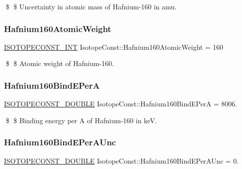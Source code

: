 \$ \$ Uncertainty in atomic mass of Hafnium-\/160 in amu. \mbox{\label{group___isotope_const-_hafnium-_hf160_gaa30ea89c0e0702326d67f6d4d49fdc7a}} 
\subsubsection{\texorpdfstring{Hafnium160\+Atomic\+Weight}{Hafnium160AtomicWeight}}
{\footnotesize\ttfamily \mbox{\hyperlink{group___isotope_const-_macros_ga5f18360b3e99483a35c32d789e62621c}{I\+S\+O\+T\+O\+P\+E\+C\+O\+N\+S\+T\+\_\+\+I\+NT}} Isotope\+Const\+::\+Hafnium160\+Atomic\+Weight = 160}

\$ \$ Atomic weight of Hafnium-\/160. \mbox{\label{group___isotope_const-_hafnium-_hf160_ga668340f5ff3a6a2ded97cff1041f5a24}} 
\subsubsection{\texorpdfstring{Hafnium160\+Bind\+E\+PerA}{Hafnium160BindEPerA}}
{\footnotesize\ttfamily \mbox{\hyperlink{group___isotope_const-_macros_ga8f45a7272ce02c0b4c65c44636ed719a}{I\+S\+O\+T\+O\+P\+E\+C\+O\+N\+S\+T\+\_\+\+D\+O\+U\+B\+LE}} Isotope\+Const\+::\+Hafnium160\+Bind\+E\+PerA = 8006.}

\$ \$ Binding energy per A of Hafnium-\/160 in keV. \mbox{\label{group___isotope_const-_hafnium-_hf160_ga02cbbff1289c23af7a1b92a6d5a8c42d}} 
\subsubsection{\texorpdfstring{Hafnium160\+Bind\+E\+Per\+A\+Unc}{Hafnium160BindEPerAUnc}}
{\footnotesize\ttfamily \mbox{\hyperlink{group___isotope_const-_macros_ga8f45a7272ce02c0b4c65c44636ed719a}{I\+S\+O\+T\+O\+P\+E\+C\+O\+N\+S\+T\+\_\+\+D\+O\+U\+B\+LE}} Isotope\+Const\+::\+Hafnium160\+Bind\+E\+Per\+A\+Unc = 0.}

